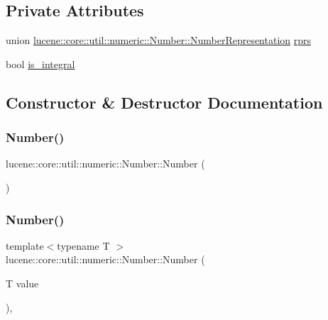 \subsection*{Private Attributes}
\begin{DoxyCompactItemize}
\item 
union \mbox{\hyperlink{unionlucene_1_1core_1_1util_1_1numeric_1_1Number_1_1NumberRepresentation}{lucene\+::core\+::util\+::numeric\+::\+Number\+::\+Number\+Representation}} \mbox{\hyperlink{classlucene_1_1core_1_1util_1_1numeric_1_1Number_a080da7ae6d9000a9c4433db59d668b10}{rprs}}
\item 
bool \mbox{\hyperlink{classlucene_1_1core_1_1util_1_1numeric_1_1Number_a8223ba3ccd6def36de11d69588d40157}{is\+\_\+integral}}
\end{DoxyCompactItemize}


\subsection{Constructor \& Destructor Documentation}
\mbox{\label{classlucene_1_1core_1_1util_1_1numeric_1_1Number_a6f7d606df5780fb44022a297469cf301}} 
\subsubsection{\texorpdfstring{Number()}{Number()}\hspace{0.1cm}{\footnotesize\ttfamily [1/3]}}
{\footnotesize\ttfamily lucene\+::core\+::util\+::numeric\+::\+Number\+::\+Number (\begin{DoxyParamCaption}{ }\end{DoxyParamCaption})\hspace{0.3cm}{\ttfamily [inline]}}

\mbox{\label{classlucene_1_1core_1_1util_1_1numeric_1_1Number_a882d32da42457953ff689a78b6cfc06c}} 
\subsubsection{\texorpdfstring{Number()}{Number()}\hspace{0.1cm}{\footnotesize\ttfamily [2/3]}}
{\footnotesize\ttfamily template$<$typename T $>$ \\
lucene\+::core\+::util\+::numeric\+::\+Number\+::\+Number (\begin{DoxyParamCaption}\item[{T}]{value }\end{DoxyParamCaption})\hspace{0.3cm}{\ttfamily [inline]}, {\ttfamily [explicit]}}

